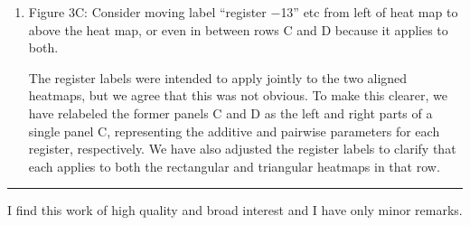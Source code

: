 \documentclass[11pt]{article}
\newenvironment{response}{\par\color{responseblue}}{\par}
\newenvironment{msquote}
  {\begin{quote}\color{responseblue}\itshape\noindent\ignorespaces}
  {\end{quote}}
\newcommand{\reviewersection}[1]{%
  \bigskip\par\noindent{\large\bfseries #1}\par\medskip\hrule\medskip}
\begin{document}
\begin{enumerate}
\begin{msquote}
The memory requirements of this algorithm scale as $O(M)$, just as for
Algorithm 1. The computational requirements, however, depend on the size of $W$
and on the size of each $S' \in W$, both of which are model-specific. For
$K$-order models specifically, the generating sets consist of all possible
subsets of $K$ positions; this means that $|W| = {L \choose K}$ and $|S'| = K$
for all $S' \in W$. The primary computational expense occurs in line 5, which is
carried out ${L \choose K}$ times. Each execution requires $K (\alpha+1)^{K+1}$
operations, following the analysis above. By comparison, the number of parameters is $M = \sum_{k=0}^K {L \choose k}\alpha^k$. Assuming $K \ll L$, we can approximate $M \approx {L \choose K} \alpha^K$. Holding $\alpha$ and $K$ fixed while increasing $L$ thus causes the computational complexity to scale as $O(M)$. $K$-adjacent models behave similarly.
\end{msquote}

\item Figure 3C: Consider moving label ``register $-$13'' etc from left of heat
map to above the heat map, or even in between rows C and D because it applies to
both.

\begin{response}
The register labels were intended to apply jointly to the two aligned heatmaps,
but we agree that this was not obvious. To make this clearer, we have
relabeled the former panels C and D as the left and right parts of a single panel
C, representing the additive and pairwise parameters for each register,
respectively. We have also adjusted the register labels to clarify that each
applies to both the rectangular and triangular heatmaps in that row.
\end{response}

\end{enumerate}

\reviewersection{Reviewer 2}

I find this work of high quality and broad interest and I have only minor
remarks.
\end{document}
